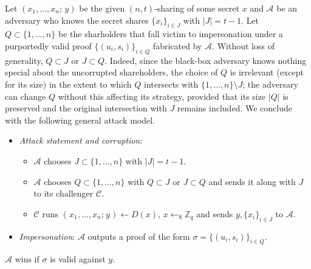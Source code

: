 \documentclass{iacrtrans}
\begin{document}
Let $(x_1, \dots, x_n;\hspace{2pt} y)$
be the given $(n, t)$-sharing of some secret $x$
and $\mathcal{A}$ be an adversary who knows
the secret shares
$\{x_i\}_{i \in J}$ with $|J| = t-1$.
Let $Q \subset \{1, \dots, n\}$ be the
sharholders that fall victim to impersonation
under a purportedly valid proof $\{(u_i, s_i)\}_{i \in Q}$
fabricated by $\mathcal{A}$.
Without loss of generality,
$Q \subset J$ or $J \subset Q$.
Indeed, since the black-box adversary knows nothing
special about the uncorrupted shareholders,
the choice of $Q$ is irrelevant
(except for its size) in the extent to which
$Q$ intersects with $\{1, \dots, n\} \setminus J$;
the adversary can change $Q$
without this affecting its strategy,
provided that its size $|Q|$ is preserved and
the original intersection with $J$ remains included.
We conclude with the following general attack model.
\begin{itemize}[label=$\bullet$,leftmargin=20pt,rightmargin=0pt]
	\vspace{4pt}
	\item
		\textit{Attack statement and corruption}:
			\begin{itemize}[
				label=$\circ$,leftmargin=17pt,rightmargin=21pt
			]
			\vspace{3pt}
			\item $\mathcal{A}$ chooses $J \subset \{1, \dots, n\}$
				with $|J| = t-1$.
				\vspace{3pt}
			\item $\mathcal{A}$ chooses $Q \subset \{1, \dots, n\}$
				with $Q \subset J$  or $J \subset Q$ and
				sends it along with $J$ to its challenger
				$\mathcal{C}$.
				\vspace{3pt}
			\item $\mathcal{C}$ runs
				$(\hspace{1pt}x_1, \dots, x_n;\hspace{1pt} y\hspace{1pt})
				\leftarrow D(x),\hspace{2pt} x \leftarrow_\$ \mathbb{Z}_q$
				and sends $y, \{x_i\}_{i \in J}$
				to $\mathcal{A}$.
			\vspace{3pt}
			\end{itemize}
	\item \textit{Impersonation}:
		$\mathcal{A}$ outputs a proof of the form
		$\sigma = \{(u_i, s_i)\}_{i \in Q}$.
\vspace{5pt}
\end{itemize}
\hspace*{5pt}%
\begin{minipage}{\dimexpr\textwidth-\parindent\relax}%
\hspace{0pt}
$\mathcal{A}$ wins if $\sigma$ is valid against $y$.
\vspace{5pt}
\end{minipage}%
\end{document}
